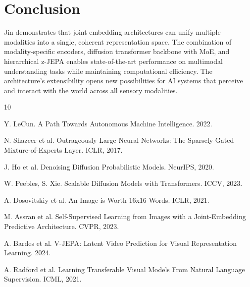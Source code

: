 \section{Conclusion}


Jin demonstrates that joint embedding architectures can unify multiple modalities into a single, coherent representation space. The combination of modality-specific encoders, diffusion transformer backbone with MoE, and hierarchical z-JEPA enables state-of-the-art performance on multimodal understanding tasks while maintaining computational efficiency. The architecture's extensibility opens new possibilities for AI systems that perceive and interact with the world across all sensory modalities.


\begin{thebibliography}{10}

Y. LeCun. A Path Towards Autonomous Machine Intelligence. 2022.

N. Shazeer et al. Outrageously Large Neural Networks: The Sparsely-Gated Mixture-of-Experts Layer. ICLR, 2017.

J. Ho et al. Denoising Diffusion Probabilistic Models. NeurIPS, 2020.

W. Peebles, S. Xie. Scalable Diffusion Models with Transformers. ICCV, 2023.

A. Dosovitskiy et al. An Image is Worth 16x16 Words. ICLR, 2021.

M. Assran et al. Self-Supervised Learning from Images with a Joint-Embedding Predictive Architecture. CVPR, 2023.

A. Bardes et al. V-JEPA: Latent Video Prediction for Visual Representation Learning. 2024.

A. Radford et al. Learning Transferable Visual Models From Natural Language Supervision. ICML, 2021.

\end{thebibliography}

